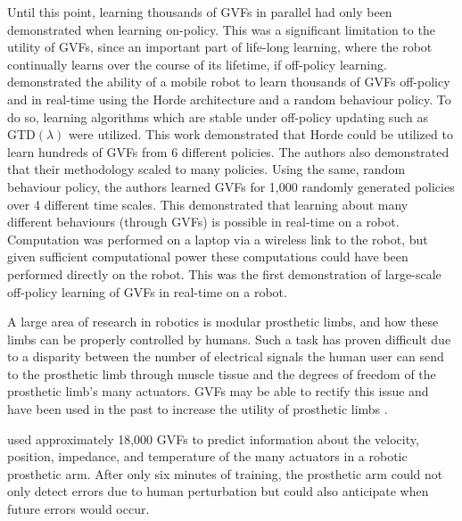 \documentclass{article} %
\theoremstyle{plain}
\theoremstyle{definition}
\theoremstyle{remark}
\begin{document}
Until this point, learning thousands of GVFs in parallel had only been demonstrated when learning on-policy. This was a
significant limitation to the utility of GVFs, since an important part of life-long learning, where the robot
continually learns over the course of its lifetime, if off-policy learning. \cite{white2012scaling} demonstrated the
ability of a mobile robot to learn thousands of GVFs off-policy and in real-time using the Horde architecture
\citep{sutton2011horde} and a random behaviour policy. To do so, learning algorithms which are stable under
off-policy updating such as GTD$(\lambda)$ \citep{maei2011gradient} were utilized. This work demonstrated that
Horde could be utilized to learn hundreds of GVFs from 6 different policies. The authors also demonstrated that their
methodology scaled to many policies. Using the same, random behaviour policy, the authors learned GVFs for 1,000
randomly generated policies over 4 different time scales. This demonstrated that learning about many
different behaviours (through GVFs) is possible in real-time on a robot. Computation was performed on a laptop via a
wireless link to the robot, but given sufficient computational power these computations could have been performed
directly on the robot. This was the first demonstration of large-scale off-policy learning of GVFs in real-time on a
robot.

A large area of research in robotics is modular prosthetic limbs, and how these limbs can be properly controlled by
humans. Such a task has proven difficult due to a disparity between the number of electrical signals the human user can
send to the prosthetic limb through muscle tissue and the degrees of freedom of the prosthetic limb's many actuators.
GVFs may be able to rectify this issue and have been used in the past to increase the utility of prosthetic limbs
\citep{sherstan2020representation,parker2019exploring,pilarski2013realtime,vassan2018context}.

\cite{pilarski2016steps} used approximately 18,000 GVFs to predict information about the velocity, position, impedance,
and temperature of the many actuators in a robotic prosthetic arm. After only six minutes of training, the prosthetic
arm could not only detect errors due to human perturbation but could also anticipate when future errors would
occur.
\end{document}
